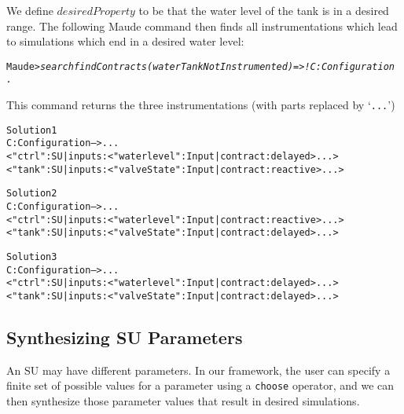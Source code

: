 \begin{example}
We define \(\mathit{desiredProperty}\) to be that the water level of the tank
is in a desired  range. 
%
The following Maude command then finds all instrumentations which
lead to simulations which end in a desired water level:

\small
\begin{alltt}
Maude> \emph{search findContracts(waterTankNotInstrumented) =>! C:Configuration\,.}
\end{alltt}
\normalsize

\noindent This command returns the three  instrumentations (with
parts replaced by `\texttt{...}')

\scriptsize
\begin{alltt}
Solution 1
C:Configuration --> ...
< "ctrl" : SU | inputs : < "waterlevel" : Input | contract : delayed > ... >
< "tank" : SU | inputs : < "valveState" : Input | contract : reactive > ... >

Solution 2
C:Configuration --> ...
< "ctrl" : SU | inputs : < "waterlevel" : Input | contract : reactive > ... >
< "tank" : SU | inputs : < "valveState" : Input | contract : delayed > ... >

Solution 3
C:Configuration --> ...
< "ctrl" : SU | inputs : < "waterlevel" : Input | contract : delayed > ... >
< "tank" : SU | inputs : < "valveState" : Input | contract : delayed > ... >
\end{alltt}
\normalsize

\end{example}

\subsection{Synthesizing SU Parameters}
An SU may have different parameters.
In our framework, the user can specify a finite set of possible values
for a parameter using a \texttt{choose} operator, and we can then
synthesize those parameter values that result in desired simulations. 
%

